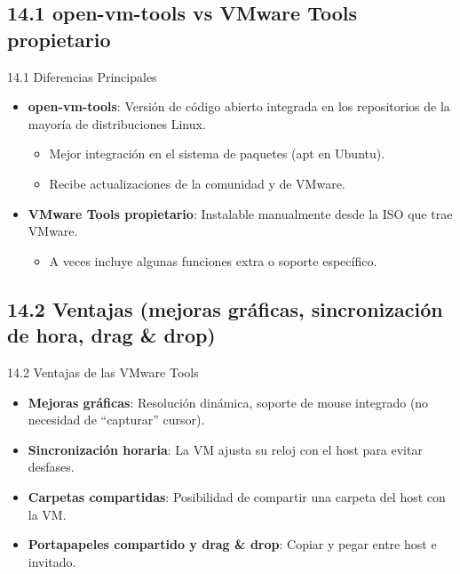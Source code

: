 \documentclass{beamer}
\begin{document}
\subsection{14.1 open-vm-tools vs VMware Tools propietario}
\begin{frame}{14.1 Diferencias Principales}
    \begin{itemize}
        \item \textbf{open-vm-tools}: Versión de código abierto integrada en los repositorios de la mayoría de distribuciones Linux.
            \begin{itemize}
                \item Mejor integración en el sistema de paquetes (apt en Ubuntu).
                \item Recibe actualizaciones de la comunidad y de VMware.
            \end{itemize}
        \item \textbf{VMware Tools propietario}: Instalable manualmente desde la ISO que trae VMware.
            \begin{itemize}
                \item A veces incluye algunas funciones extra o soporte específico.
            \end{itemize}
    \end{itemize}
\end{frame}

\subsection{14.2 Ventajas (mejoras gráficas, sincronización de hora, drag \& drop)}
\begin{frame}{14.2 Ventajas de las VMware Tools}
    \begin{itemize}
        \item \textbf{Mejoras gráficas}: Resolución dinámica, soporte de mouse integrado (no necesidad de “capturar” cursor).
        \item \textbf{Sincronización horaria}: La VM ajusta su reloj con el host para evitar desfases.
        \item \textbf{Carpetas compartidas}: Posibilidad de compartir una carpeta del host con la VM.
        \item \textbf{Portapapeles compartido y drag \& drop}: Copiar y pegar entre host e invitado.
    \end{itemize}
\end{frame}
\end{document}
